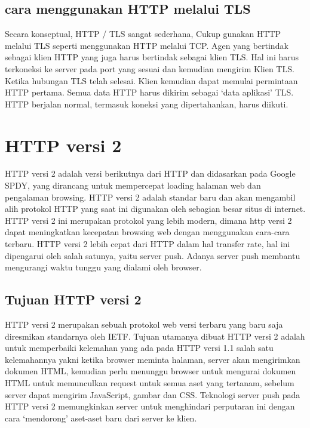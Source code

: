 \subsection{cara menggunakan HTTP melalui TLS}
Secara konseptual, HTTP / TLS sangat sederhana, Cukup gunakan HTTP melalui TLS seperti menggunakan HTTP melalui TCP. Agen yang bertindak sebagai klien HTTP yang juga harus bertindak sebagai klien TLS. Hal ini harus terkoneksi ke server pada port yang sesuai dan kemudian mengirim Klien TLS. Ketika hubungan TLS telah selesai. Klien kemudian dapat memulai permintaan HTTP pertama. Semua data HTTP harus dikirim sebagai `data aplikasi' TLS. HTTP berjalan normal, termasuk koneksi yang dipertahankan, harus diikuti\cite{rescorla2000http}.

\section{HTTP versi 2}
HTTP versi 2 adalah versi berikutnya dari HTTP dan didasarkan pada Google SPDY, yang dirancang untuk mempercepat loading halaman web dan pengalaman browsing. HTTP versi 2 adalah standar baru dan akan mengambil alih protokol HTTP yang saat ini digunakan oleh sebagian besar situs di internet. HTTP versi 2 ini merupakan protokol yang lebih modern, dimana http versi 2 dapat meningkatkan kecepatan browsing web dengan menggunakan cara-cara terbaru. HTTP versi 2 lebih cepat dari HTTP dalam hal transfer rate, hal ini dipengarui oleh salah satunya, yaitu server push. Adanya server push membantu mengurangi waktu tunggu yang dialami oleh browser\cite{engku2016analisis}.

\subsection{Tujuan HTTP versi 2}
HTTP versi 2 merupakan sebuah protokol web versi terbaru yang baru saja diresmikan standarnya oleh IETF. Tujuan utamanya dibuat HTTP versi 2 adalah untuk memperbaiki kelemahan yang ada pada HTTP versi 1.1 salah satu kelemahannya yakni ketika browser meminta halaman, server akan mengirimkan dokumen HTML, kemudian perlu menunggu browser untuk mengurai dokumen HTML untuk memunculkan request untuk semua aset yang tertanam, sebelum server dapat mengirim JavaScript, gambar dan CSS. Teknologi server push pada HTTP versi 2 memungkinkan server untuk menghindari perputaran ini dengan cara `mendorong' aset-aset baru dari server ke klien\cite{engku2016analisis}.

